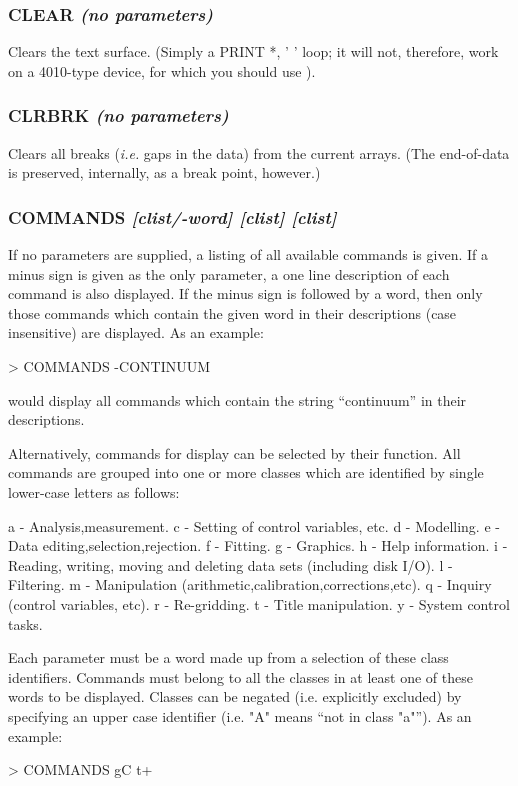 \documentclass[twoside,11pt,noabs,nolof]{starlink}
\providecommand{\dipcom}[3]{\subsubsection*{\label{COM:#1}\xlabel{COM:#1}\textbf{#1} \emph{#2}}}
\begin{document}
\dipcom{CLEAR}{(no parameters)}{Clears the command window}
Clears the text surface. (Simply a PRINT *, ' ' loop; it will not,
therefore, work on a 4010-type device, for which you should use
).

\dipcom{CLRBRK}{(no parameters)}{Removes breaks from an array}
Clears all breaks (\emph{i.e.} gaps in the data) from the current
arrays. (The end-of-data is preserved, internally, as a break point,
however.)

\dipcom{COMMANDS}{[clist/-word] [clist] [clist]}{Display classified lists of commands with brief descriptions}
If no parameters are supplied, a listing of all available commands is
given. If a minus sign is given as the only parameter, a one line
description of each command is also displayed. If the minus sign is
followed by a word, then only those commands which contain the given
word in their descriptions (case insensitive) are displayed. As an example:

\begin{terminalv}
> COMMANDS -CONTINUUM
\end{terminalv}

would display all commands which contain the string ``continuum'' in their
descriptions.

Alternatively, commands for display can be selected by their function.
All commands are grouped into one or more classes which are identified
by single lower-case letters as follows:

\begin{terminalv}
a - Analysis,measurement.
c - Setting of control variables, etc.
d - Modelling.
e - Data editing,selection,rejection.
f - Fitting.
g - Graphics.
h - Help information.
i - Reading, writing, moving and deleting data sets (including
    disk I/O).
l - Filtering.
m - Manipulation (arithmetic,calibration,corrections,etc).
q - Inquiry (control variables, etc).
r - Re-gridding.
t - Title manipulation.
y - System control tasks.
\end{terminalv}

Each parameter must be a word made up from a selection of these class
identifiers. Commands must belong to all the classes in at least one of
these words to be displayed. Classes can be negated (i.e. explicitly
excluded) by specifying an upper case identifier (i.e. "A" means ``not
in class "a"''). As an example:

\begin{terminalv}
> COMMANDS gC t+
\end{terminalv}
\end{document}
